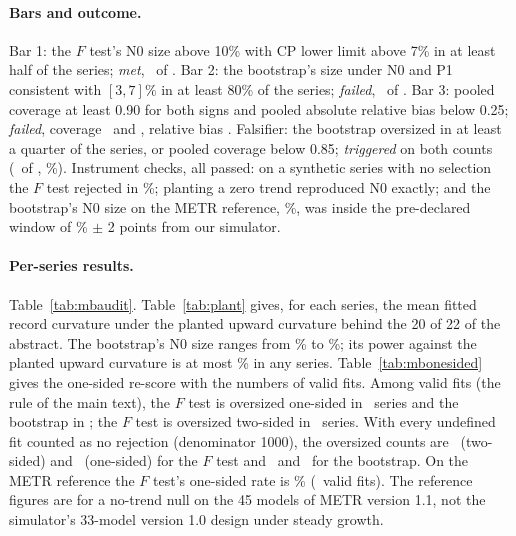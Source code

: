 \documentclass[aps,pre,twocolumn,superscriptaddress,nofootinbib,9pt]{revtex4-2}
\begin{document}
\paragraph*{Bars and outcome.} Bar 1: the $F$ test's N0 size above 10\% with CP lower limit above 7\% in at least half of the series; \emph{met}, \mbBarOne\ of \mbN. Bar 2: the bootstrap's size under N0 and P1 consistent with $[3,7]\%$ in at least 80\% of the series; \emph{failed}, \mbBarTwo\ of \mbN. Bar 3: pooled coverage at least 0.90 for both signs and pooled absolute relative bias below 0.25; \emph{failed}, coverage \mbCovPlus\ and \mbCovMinus, relative bias \mbRelBias. Falsifier: the bootstrap oversized in at least a quarter of the series, or pooled coverage below 0.85; \emph{triggered} on both counts (\mbOver\ of \mbN, \mbOverPct\%). Instrument checks, all passed: on a synthetic series with no selection the $F$ test rejected in \mbCheckIid\%; planting a zero trend reproduced N0 exactly; and the bootstrap's N0 size on the METR reference, \mbRefSize\%, was inside the pre-declared window of \baseMbSota\% $\pm$ 2 points from our simulator.

\paragraph*{Per-series results.} Table~\ref{tab:mbaudit}. Table~\ref{tab:plant} gives, for each series, the mean fitted record curvature under the planted upward curvature behind the 20 of 22 of the abstract. The bootstrap's N0 size ranges from \mbMbMin\% to \mbMbMax\%; its power against the planted upward curvature is at most \mbPowPlusMax\% in any series. Table~\ref{tab:mbonesided} gives the one-sided re-score with the numbers of valid fits. Among valid fits (the rule of the main text), the $F$ test is oversized one-sided in \mbIidOneOver\ series and the bootstrap in \mbMbOneOver; the $F$ test is oversized two-sided in \mbBarOne\ series. With every undefined fit counted as no rejection (denominator 1000), the oversized counts are \mbIidTwoOverAtt\ (two-sided) and \mbIidOneOverAtt\ (one-sided) for the $F$ test and \mbMbTwoOverAtt\ and \mbMbOneOverAtt\ for the bootstrap. On the METR reference the $F$ test's one-sided rate is \mbRefIidOne\% (\mbRefIidN\ valid fits). The reference figures are for a no-trend null on the 45 models of METR version 1.1, not the simulator's 33-model version 1.0 design under steady growth.
\end{document}
